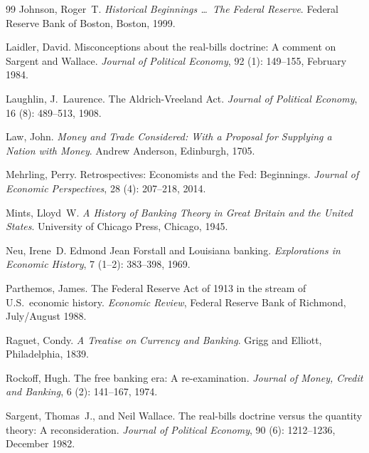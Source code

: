 \documentclass[12pt]{article}
\begin{document}
\begin{thebibliography}{99}
  Johnson, Roger~T.
  \newblock \emph{Historical Beginnings \ldots\ The Federal Reserve}.
  \newblock Federal Reserve Bank of Boston, Boston, 1999.

  Laidler, David.
  \newblock Misconceptions about the real-bills doctrine: A comment on Sargent
    and Wallace.
  \newblock \emph{Journal of Political Economy}, 92 (1):
    149--155, February 1984.

  Laughlin, J.~Laurence.
  \newblock The Aldrich-Vreeland Act.
  \newblock \emph{Journal of Political Economy}, 16 (8):
    489--513, 1908.

  Law, John.
  \newblock \emph{Money and Trade Considered: With a Proposal for Supplying a
    Nation with Money}.
  \newblock Andrew Anderson, Edinburgh, 1705.

  Mehrling, Perry.
  \newblock Retrospectives: Economists and the Fed: Beginnings.
  \newblock \emph{Journal of Economic Perspectives}, 28 (4):
    207--218, 2014.

  Mints, Lloyd~W.
  \newblock \emph{A History of Banking Theory in Great Britain and the United
    States}.
  \newblock University of Chicago Press, Chicago, 1945.

  Neu, Irene~D.
  \newblock Edmond Jean Forstall and Louisiana banking.
  \newblock \emph{Explorations in Economic History}, 7 (1--2):
    383--398, 1969.

  Parthemos, James.
  \newblock The Federal Reserve Act of 1913 in the stream of U.S.\ economic
    history.
  \newblock \emph{Economic Review}, Federal Reserve Bank of Richmond,
    July/August 1988.

  Raguet, Condy.
  \newblock \emph{A Treatise on Currency and Banking}.
  \newblock Grigg and Elliott, Philadelphia, 1839.

  Rockoff, Hugh.
  \newblock The free banking era: A re-examination.
  \newblock \emph{Journal of Money, Credit and Banking}, 6
    (2): 141--167, 1974.

  Sargent, Thomas~J., and Neil Wallace.
  \newblock The real-bills doctrine versus the quantity theory: A
    reconsideration.
  \newblock \emph{Journal of Political Economy}, 90 (6):
    1212--1236, December 1982.


\end{thebibliography}
\end{document}
